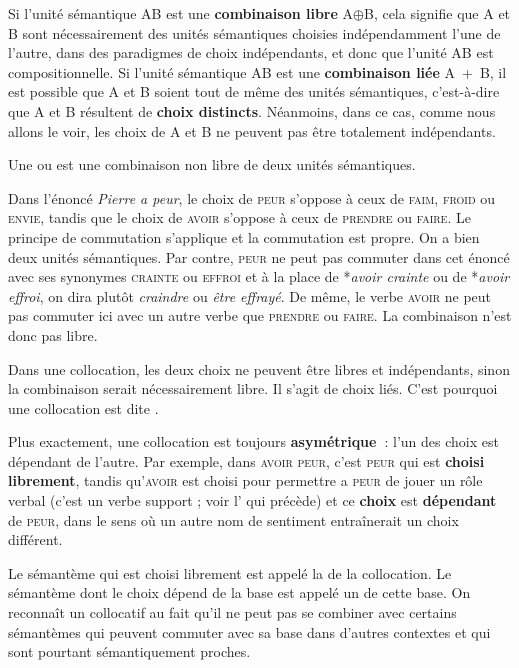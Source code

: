 Si l’unité sémantique AB est une \textbf{combinaison libre} A${\oplus}$B, cela signifie que A et B sont nécessairement des unités sémantiques choisies indépendamment l’une de l’autre, dans des paradigmes de choix indépendants, et donc que l’unité AB est compositionnelle. Si l’unité sémantique AB est une \textbf{combinaison liée} A~+~B, il est possible que A et B soient tout de même des unités sémantiques, c’est-à-dire que A et B résultent de \textbf{choix distincts}. Néanmoins, dans ce cas, comme nous allons le voir, les choix de A et B ne peuvent pas être totalement indépendants.

{Une  ou  est une combinaison non libre de deux unités sémantiques.}

Dans l’énoncé \textit{Pierre a peur}, le choix de \textsc{peur} s’oppose à ceux de \textsc{faim,} \textsc{froid} ou \textsc{envie}, tandis que le choix de \textsc{avoir} s’oppose à ceux de \textsc{prendre} ou \textsc{faire}. Le principe de commutation s’applique et la commutation est propre. On a bien deux unités sémantiques. Par contre, \textsc{peur} ne peut pas commuter dans cet énoncé avec ses synonymes \textsc{crainte} ou \textsc{effroi} et à la place de *\textit{avoir crainte} ou de *\textit{avoir effroi}, on dira plutôt \textit{craindre} ou \textit{être effrayé}. De même, le verbe \textsc{avoir} ne peut pas commuter ici avec un autre verbe que \textsc{prendre} ou \textsc{faire}. La combinaison n’est donc pas libre.

{Dans une collocation, les deux choix ne peuvent être libres et indépendants, sinon la combinaison serait nécessairement libre. Il s’agit de choix liés. C’est pourquoi une collocation est dite .}

Plus exactement, une collocation est toujours \textbf{asymétrique~}: l’un des choix est dépendant de l’autre. Par exemple, dans \textsc{avoir} \textsc{peur}, c’est \textsc{peur} qui est \textbf{choisi librement}, tandis qu’\textsc{avoir} est choisi pour permettre a \textsc{peur} de jouer un rôle verbal (c’est un verbe support ; voir l’ qui précède) et ce \textbf{choix} est \textbf{dépendant} de \textsc{peur}, dans le sens où un autre nom de sentiment entraînerait un choix différent.

{Le sémantème qui est choisi librement est appelé la  de la collocation. Le sémantème dont le choix dépend de la base est appelé un  de cette base. On reconnaît un collocatif au fait qu’il ne peut pas se combiner avec certains sémantèmes qui peuvent commuter avec sa base dans d’autres contextes et qui sont pourtant sémantiquement proches.}


